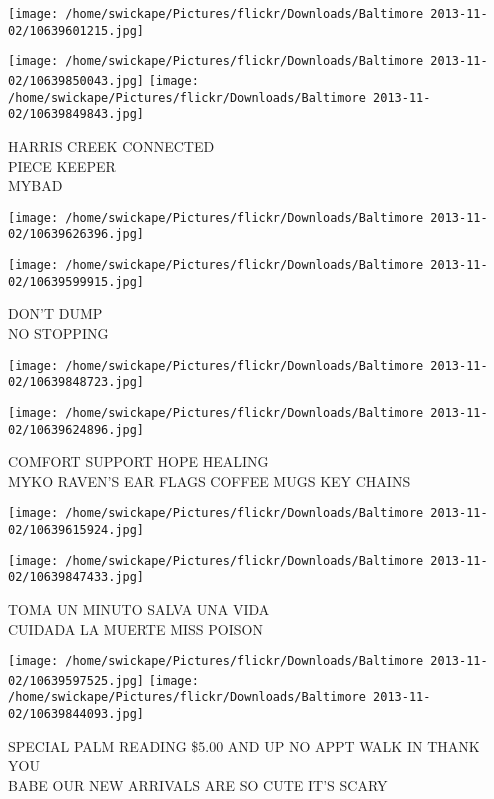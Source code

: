 \documentclass[10pt,letterpaper]{article}
\begin{document}
\texttt{[image: /home/swickape/Pictures/flickr/Downloads/Baltimore 2013-11-02/10639601215.jpg]}

\vspace{0.25in}
\texttt{[image: /home/swickape/Pictures/flickr/Downloads/Baltimore 2013-11-02/10639850043.jpg]}
\texttt{[image: /home/swickape/Pictures/flickr/Downloads/Baltimore 2013-11-02/10639849843.jpg]}

HARRIS CREEK CONNECTED\\
PIECE KEEPER\\
MYBAD\\
\pagebreak

\texttt{[image: /home/swickape/Pictures/flickr/Downloads/Baltimore 2013-11-02/10639626396.jpg]}

\vspace{0.25in}
\texttt{[image: /home/swickape/Pictures/flickr/Downloads/Baltimore 2013-11-02/10639599915.jpg]}

DON'T DUMP\\
NO STOPPING\\
\pagebreak

\texttt{[image: /home/swickape/Pictures/flickr/Downloads/Baltimore 2013-11-02/10639848723.jpg]}

\vspace{0.25in}
\texttt{[image: /home/swickape/Pictures/flickr/Downloads/Baltimore 2013-11-02/10639624896.jpg]}

COMFORT SUPPORT HOPE HEALING\\
MYKO RAVEN'S EAR FLAGS COFFEE MUGS KEY CHAINS\\
\pagebreak

\texttt{[image: /home/swickape/Pictures/flickr/Downloads/Baltimore 2013-11-02/10639615924.jpg]}

\vspace{0.25in}
\texttt{[image: /home/swickape/Pictures/flickr/Downloads/Baltimore 2013-11-02/10639847433.jpg]}

TOMA UN MINUTO SALVA UNA VIDA\\
CUIDADA LA MUERTE MISS POISON\\
\pagebreak

\texttt{[image: /home/swickape/Pictures/flickr/Downloads/Baltimore 2013-11-02/10639597525.jpg]}
\texttt{[image: /home/swickape/Pictures/flickr/Downloads/Baltimore 2013-11-02/10639844093.jpg]}

SPECIAL PALM READING \$5.00 AND UP NO APPT WALK IN THANK YOU\\
BABE OUR NEW ARRIVALS ARE SO CUTE IT'S SCARY\\
\pagebreak
\end{document}
